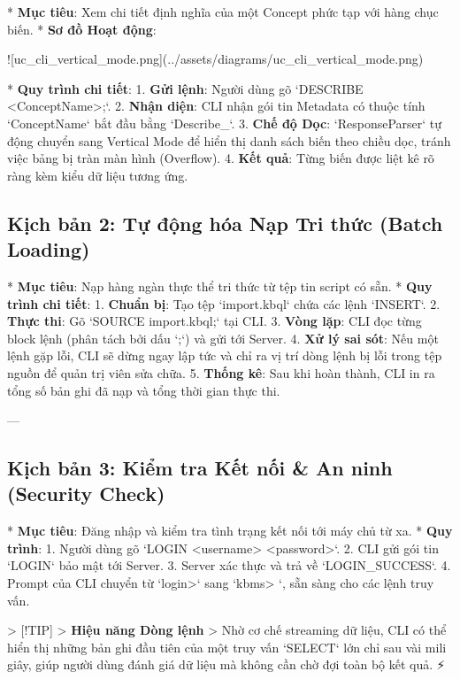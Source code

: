 *   \textbf{Mục tiêu}: Xem chi tiết định nghĩa của một Concept phức tạp với hàng chục biến.
*   \textbf{Sơ đồ Hoạt động}:

![uc\_cli\_vertical\_mode.png](../assets/diagrams/uc\_cli\_vertical\_mode.png)

*   \textbf{Quy trình chi tiết}:
    1.  \textbf{Gửi lệnh}: Người dùng gõ `DESCRIBE <ConceptName>;`.
    2.  \textbf{Nhận diện}: CLI nhận gói tin Metadata có thuộc tính `ConceptName` bắt đầu bằng `Describe\_`.
    3.  \textbf{Chế độ Dọc}: `ResponseParser` tự động chuyển sang Vertical Mode để hiển thị danh sách biến theo chiều dọc, tránh việc bảng bị tràn màn hình (Overflow).
    4.  \textbf{Kết quả}: Từng biến được liệt kê rõ ràng kèm kiểu dữ liệu tương ứng.

\subsection{Kịch bản 2: Tự động hóa Nạp Tri thức (Batch Loading)}

*   \textbf{Mục tiêu}: Nạp hàng ngàn thực thể tri thức từ tệp tin script có sẵn.
*   \textbf{Quy trình chi tiết}:
    1.  \textbf{Chuẩn bị}: Tạo tệp `import.kbql` chứa các lệnh `INSERT`.
    2.  \textbf{Thực thi}: Gõ `SOURCE import.kbql;` tại CLI.
    3.  \textbf{Vòng lặp}: CLI đọc từng block lệnh (phân tách bởi dấu `;`) và gửi tới Server.
    4.  \textbf{Xử lý sai sót}: Nếu một lệnh gặp lỗi, CLI sẽ dừng ngay lập tức và chỉ ra vị trí dòng lệnh bị lỗi trong tệp nguồn để quản trị viên sửa chữa.
    5.  \textbf{Thống kê}: Sau khi hoàn thành, CLI in ra tổng số bản ghi đã nạp và tổng thời gian thực thi.

---

\subsection{Kịch bản 3: Kiểm tra Kết nối & An ninh (Security Check)}

*   \textbf{Mục tiêu}: Đăng nhập và kiểm tra tình trạng kết nối tới máy chủ từ xa.
*   \textbf{Quy trình}:
    1.  Người dùng gõ `LOGIN <username> <password>`.
    2.  CLI gửi gói tin `LOGIN` bảo mật tới Server.
    3.  Server xác thực và trả về `LOGIN\_SUCCESS`.
    4.  Prompt của CLI chuyển từ `login>` sang `kbms> `, sẵn sàng cho các lệnh truy vấn.

> [!TIP]
> \textbf{Hiệu năng Dòng lệnh}
> Nhờ cơ chế streaming dữ liệu, CLI có thể hiển thị những bản ghi đầu tiên của một truy vấn `SELECT` lớn chỉ sau vài mili giây, giúp người dùng đánh giá dữ liệu mà không cần chờ đợi toàn bộ kết quả. ⚡

